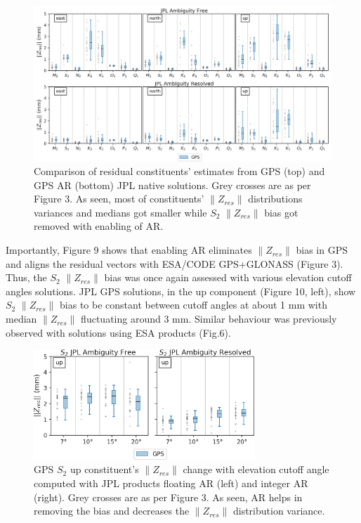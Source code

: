 \documentclass[se, manuscript]{copernicus}
\begin{document}
\begin{figure}[t]
\includegraphics[width=17cm]{fig09.png}
\caption{Comparison of residual constituents’ estimates from GPS (top) and GPS AR (bottom) JPL native solutions. Grey crosses are as per Figure 3. As seen, most of constituents’ $\|Z_{res}\|$ distributions variances and medians got smaller while $S_2$ $\|Z_{res}\|$ bias got removed with enabling of AR.}
\end{figure}
Importantly, Figure 9 shows that enabling AR eliminates $\|Z_{res}\|$ bias in GPS and aligns the residual vectors with ESA/CODE GPS+GLONASS (Figure 3). Thus, the $S_2$ $\|Z_{res}\|$ bias was once again assessed with various elevation cutoff angles solutions. JPL GPS solutions, in the up component (Figure 10, left), show $S_2$ $\|Z_{res}\|$ bias to be constant between cutoff angles at about 1 mm with median $\|Z_{res}\|$ fluctuating around 3 mm. Similar behaviour was previously observed with solutions using ESA products (Fig.6).

\begin{figure}[t]
\includegraphics[width=8.3cm]{fig10.png}
\caption{GPS $S_2$ up constituent’s $\|Z_{res}\|$ change with elevation cutoff angle computed with JPL products floating AR (left) and integer AR (right). Grey crosses are as per Figure 3. As seen, AR helps in removing the bias and  decreases the $\|Z_{res}\|$ distribution variance.}
\end{figure}
\end{document}
